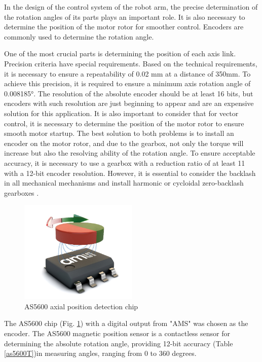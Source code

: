 In the design of the control system of the robot arm, the precise determination of the rotation angles of its parts plays an important role. It is also necessary to determine the position of the motor rotor for smoother control. Encoders are commonly used to determine the rotation angle.

One of the most crucial parts is determining the position of each axis link. Precision criteria have special requirements. Based on the technical requirements, it is necessary to ensure a repeatability of 0.02 mm at a distance of 350mm. To achieve this precision, it is required to ensure a minimum axis rotation angle of 0.008185°. The resolution of the absolute encoder should be at least 16 bits, but encoders with such resolution are just beginning to appear and are an expensive solution for this application. It is also important to consider that for vector control, it is necessary to determine the position of the motor rotor to ensure smooth motor startup. The best solution to both problems is to install an encoder on the motor rotor, and due to the gearbox, not only the torque will increase but also the resolving ability of the rotation angle. To ensure acceptable accuracy, it is necessary to use a gearbox with a reduction ratio of at least 11 with a 12-bit encoder resolution. However, it is essential to consider the backlash in all mechanical mechanisms and install harmonic or cycloidal zero-backlash gearboxes \citep{Sensinger2012}.


\begin{figure}[H]
	\centering
	\includegraphics[width=0.5\textwidth]{Src/images/as5600.png}
	\caption{AS5600 axial position detection chip}
	\label{as5600P}
\end{figure}
The AS5600 chip (Fig. \ref{as5600P}) with a digital output from "AMS" was chosen as the encoder. The AS5600 magnetic position sensor is a contactless sensor for determining the absolute rotation angle, providing 12-bit accuracy (Table \ref{as5600T})in measuring angles, ranging from 0 to 360 degrees. 

